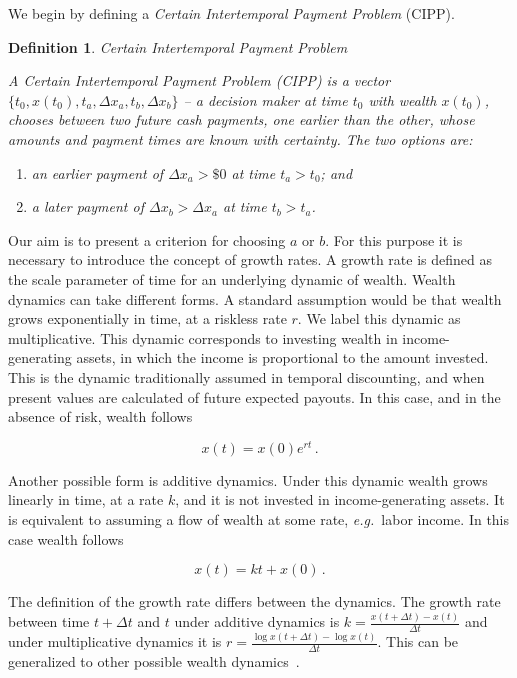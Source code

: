 \documentclass[11pt]{article}
\newtheorem{definition}{Definition}
\newcommand{\eg}{{\it e.g.}\ }
\newcommand{\be}{\begin{equation}}
\newcommand{\ee}{\end{equation}}
\newcommand{\Dt}{\Delta t}
\newcommand{\Dx}{\Delta x}
\numberwithin{equation}{section}
\begin{document}
We begin by defining a \textit{Certain Intertemporal Payment Problem} (CIPP).

\begin{definition}{Certain Intertemporal Payment Problem}

A Certain Intertemporal Payment Problem (CIPP) is a vector $\{t_0,x\left(t_0\right),t_a,\Dx_a,t_b,\Dx_b\}$ -- a decision maker at time $t_0$ with wealth $x\left(t_0\right)$, chooses between two future cash payments, one earlier than the other, whose amounts and payment times are known with certainty. The two options are:

\begin{enumerate}
\item[$a$.] an earlier payment of $\Dx_a>\$ 0$ at time $t_a>t_0$; and
\item[$b$.] a later payment of $\Dx_b>\Dx_a$ at time $t_b>t_a$.
\end{enumerate}

\end{definition}

Our aim is to present a criterion for choosing $a$ or $b$. For this purpose it is necessary to introduce the concept of growth rates. A growth rate is defined as the scale parameter of time for an underlying dynamic of wealth. Wealth dynamics can take different forms. A standard assumption would be that wealth grows exponentially in time, at a riskless rate $r$. We label this dynamic as multiplicative. This dynamic corresponds to investing wealth in income-generating assets, in which the income is proportional to the amount invested. This is the dynamic traditionally assumed in temporal discounting, and when present values are calculated of future expected payouts. In this case, and in the absence of risk, wealth follows

\be
x\left(t\right) = x\left(0\right) e^{r t}\,.
\ee

Another possible form is additive dynamics. Under this dynamic wealth grows linearly in time, at a rate $k$, and it is not invested in income-generating assets. It is equivalent to assuming a flow of wealth at some rate, \eg labor income. In this case wealth follows

\be
x\left(t\right) = k t + x\left(0\right)\,.
\ee

The definition of the growth rate differs between the dynamics. The growth rate between time $t+\Dt$ and $t$ under additive dynamics is $k = \frac{x\left(t+\Dt\right)-x\left(t\right)}{\Dt}$ and under multiplicative dynamics it is $r = \frac{\log x(t+\Dt)-\log x(t)}{\Dt}$. This can be generalized to other possible wealth dynamics~\citep{peters2016evaluating,peters2018time}.
\end{document}
